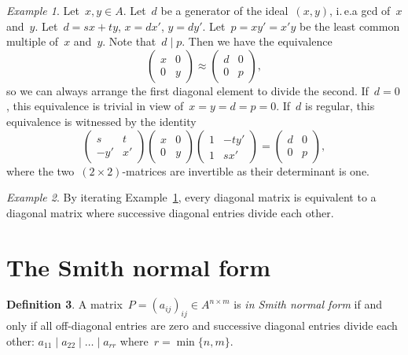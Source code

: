 \documentclass[12pt]{scrartcl}
\theoremstyle{definition}
\newtheorem{definition}{Definition}[section]
\theoremstyle{plain}
\theoremstyle{remark}
\newtheorem{example}[definition]{Example}
\begin{document}
\begin{example}\label{ex:diag-divide}
    Let~$x,y \in A$. Let~$d$ be a generator of the ideal~$(x,y)$, i.\,e.\@ a gcd of~$x$ and~$y$. Let~$d = sx+ty$, $x=dx'$, $y = dy'$. Let~$p=xy'=x'y$ be the least common multiple of~$x$ and~$y$. Note that~$d \mid p$. Then we 
    have the equivalence
    \[ \begin{pmatrix}x&0\\0&y\end{pmatrix} \approx \begin{pmatrix}d&0\\0&p\end{pmatrix}\!,\]
    so we can always arrange the first diagonal element to divide the second.
    If~$d = 0$, this equivalence is trivial in view of~$x = y = d = p = 0$. If~$d$ is regular, this equivalence is witnessed by the identity
    \[ \begin{pmatrix}s&t\\-y'&x'\end{pmatrix} \begin{pmatrix}x&0\\0&y\end{pmatrix} \begin{pmatrix}1&-ty'\\1&sx'\end{pmatrix} = \begin{pmatrix}d&0\\0&p\end{pmatrix}\!,\]
    where the two~$(2\times2)$-matrices are invertible as their determinant is one.
\end{example}

\begin{example}\label{ex:diag-divide-many}
    By iterating Example~\ref{ex:diag-divide}, every diagonal matrix is equivalent to a diagonal matrix where successive diagonal entries divide each other.
\end{example}


\section{The Smith normal form}

\begin{definition}A matrix~$P = (a_{ij})_{ij} \in A^{n \times m}$ is \emph{in Smith normal form} if and only if all off-diagonal entries are zero and successive diagonal entries divide each other: $a_{11} \mid a_{22} \mid \ldots \mid a_{rr}$ where~$r = \min\{n,m\}$.\end{definition}
\end{document}
